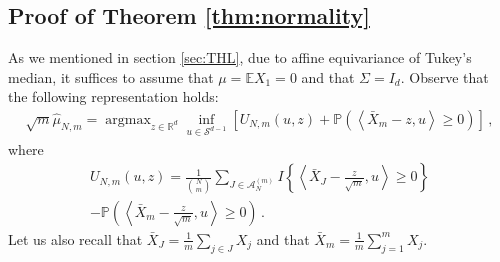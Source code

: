 \documentclass[12pt]{article}
\providecommand{\argmax}{\mathop\mathrm{arg max}} %
\newcommand{\wh}{\widehat}
\def\l{\left}
\def\r{\right}
\newcommand{\m}{\mathcal}
\newcommand{\mb}{\mathbb}
\newcommand{\pr}[1]{\mathbb{P}{\left(#1\right)}}
\newcommand{\dotp}[2]{\left\langle#1,#2\right\rangle}
\theoremstyle{thmstyletwo}%
\theoremstyle{thmstylethree}%
\begin{document}

\subsection{Proof of Theorem \ref{thm:normality}}

 

As we mentioned in section \ref{sec:THL}, due to affine equivariance of Tukey's median, it suffices to assume that $\mu=\mb E X_1 = 0$ and that $\Sigma = I_d$. Observe that the following representation holds:
\begin{align}\label{eq:u-z-process}
    \sqrt{m}\wh \mu_{N,m} = \argmax_{z \in \mb R^d} \inf_{u \in \mathcal{S}^{d-1}} \l[U_{N,m}\l(u,z\r) + \pr{\dotp{\bar X_m  - z}{u}\geq 0}\r]\,,
\end{align}
where
\begin{multline*}
    U_{N,m}(u,z) = \frac{1}{{N\choose m}} \sum_{J\in \m A_{N}^{(m)} }I\left\{ \dotp{\bar X_J - \frac{z}{\sqrt{m}}}{u}\geq 0\right\} \\
    - \pr{\dotp{\bar X_m  - \frac{z}{\sqrt{m}}}{u}\geq 0} \,.
\end{multline*}
Let us also recall that $\bar X_J = \frac{1}{m}\sum_{j \in J}X_j$ and that $\bar X_m = \frac{1}{m}\sum_{j=1}^m X_j$.
\end{document}
